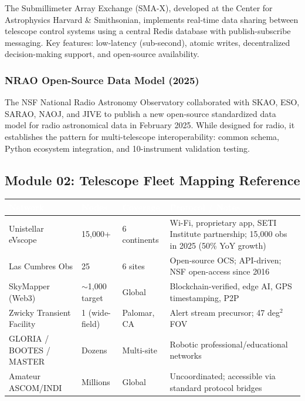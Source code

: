 \documentclass[11pt,letterpaper]{article}
\newcommand{\tableheader}[1]{\textbf{\sffamily\textcolor{white}{#1}}}
\begin{document}
The Submillimeter Array Exchange (SMA-X), developed at the Center for Astrophysics Harvard \& Smithsonian, implements real-time data sharing between telescope control systems using a central Redis database with publish-subscribe messaging. Key features: low-latency (sub-second), atomic writes, decentralized decision-making support, and open-source availability.

\subsubsection{NRAO Open-Source Data Model (2025)}

The NSF National Radio Astronomy Observatory collaborated with SKAO, ESO, SARAO, NAOJ, and JIVE to publish a new open-source standardized data model for radio astronomical data in February 2025. While designed for radio, it establishes the pattern for multi-telescope interoperability: common schema, Python ecosystem integration, and 10-instrument validation testing.

\subsection{Module 02: Telescope Fleet Mapping Reference}

\begin{center}
\begin{tabularx}{\textwidth}{L{3.5cm}L{2cm}L{2.5cm}X}
\toprule
{}
\tableheader{Network} & \tableheader{Nodes} & \tableheader{Coverage} & \tableheader{Protocol / Notes} \\
\midrule
Unistellar eVscope & 15,000+ & 6 continents & Wi-Fi, proprietary app, SETI Institute partnership; 15,000 obs in 2025 (50\% YoY growth) \\
Las Cumbres Obs & 25 & 6 sites & Open-source OCS; API-driven; NSF open-access since 2016 \\
SkyMapper (Web3) & $\sim$1,000 target & Global & Blockchain-verified, edge AI, GPS timestamping, P2P \\
Zwicky Transient Facility & 1 (wide-field) & Palomar, CA & Alert stream precursor; 47 deg$^2$ FOV \\
GLORIA / BOOTES / MASTER & Dozens & Multi-site & Robotic professional/educational networks \\
Amateur ASCOM/INDI & Millions & Global & Uncoordinated; accessible via standard protocol bridges \\
\bottomrule
\end{tabularx}
\end{center}
\end{document}
